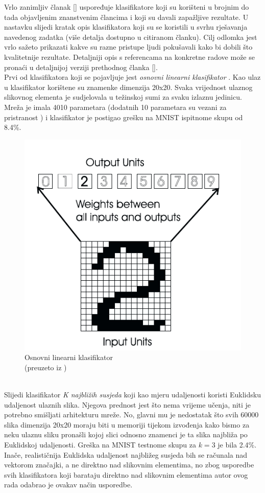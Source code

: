\documentclass[times, utf8, diplomski]{fer}
\theoremstyle{definition}
\begin{document}
Vrlo zanimljiv članak [\cite{LeCun95comparisonof}] uspoređuje klasifikatore koji su korišteni u brojnim do tada objavljenim znanstvenim člancima i koji su davali zapažljive rezultate. U nastavku slijedi kratak opis klasifikatora koji su se koristili u svrhu rješavanja navedenog zadatka (više detalja dostupno u citiranom članku). Cilj odlomka jest vrlo sažeto prikazati kakve su razne pristupe ljudi pokušavali kako bi dobili što kvalitetnije rezultate. Detaljniji opis s referencama na konkretne radove može se pronaći u detaljnijoj verziji prethodnog članka [\cite{Lecun95learningalgorithms}].
\\
Prvi od klasifikatora koji se pojavljuje jest \textit{osnovni linearni klasifikator} . Kao ulaz u klasifikator korištene su znamenke dimenzija 20x20. Svaka vrijednost ulaznog slikovnog elementa  je sudjelovala u težinskoj sumi za svaku izlaznu jedinicu. Mreža je imala 4010 parametara (dodatnih 10 parametara su vezani za pristranost ) i klasifikator je postigao grešku na MNIST ispitnome skupu od 8.4\%.
\begin{figure}[h]
\centering
\includegraphics[scale=0.7]{linear_classifier.png}
\caption{Osnovni linearni klasifikator \\ (preuzeto iz \cite{Lecun95learningalgorithms})}
\end{figure}
\\
Slijedi klasifikator \textit{K najbližih susjeda}  koji kao mjeru udaljenosti koristi Euklidsku udaljenost ulaznih slika. Njegova prednost jest što nema vrijeme učenja, niti je potrebno smišljati arhitekturu mreže. No, glavni mu je nedostatak što svih 60000 slika dimenzija 20x20 moraju biti u memoriji tijekom izvođenja kako bismo za neku ulaznu sliku pronašli kojoj slici odnosno znamenci je ta slika najbliža po Euklidskoj udaljenosti. Greška na MNIST testnome skupu za $k=3$ je bila 2.4\%. Inače, realističnija Euklidska udaljenost najbližeg susjeda bih se računala nad vektorom značajki, a ne direktno nad slikovnim elementima, no zbog usporedbe svih klasifikatora koji barataju direktno nad slikovnim elementima autor ovog rada odabrao je ovakav način usporedbe.
\end{document}
